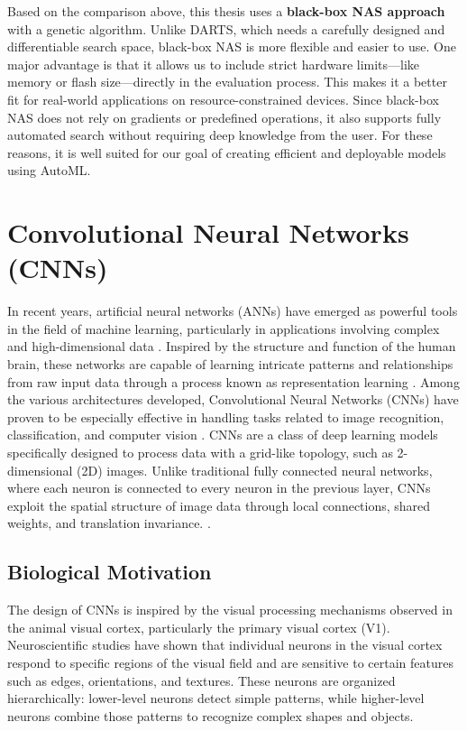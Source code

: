 \begin{sloppypar}
Based on the comparison above, this thesis uses a \textbf{black-box NAS approach} with a genetic algorithm. Unlike DARTS, which needs a carefully designed and differentiable search space, black-box NAS is more flexible and easier to use. One major advantage is that it allows us to include strict hardware limits—like memory or flash size—directly in the evaluation process. This makes it a better fit for real-world applications on resource-constrained devices. Since black-box NAS does not rely on gradients or predefined operations, it also supports fully automated search without requiring deep knowledge from the user. For these reasons, it is well suited for our goal of creating efficient and deployable models using AutoML.
\end{sloppypar}


\section{Convolutional Neural Networks (CNNs)}

In recent years, artificial neural networks (ANNs) have emerged as powerful tools in the field of machine learning, particularly in applications involving complex and high-dimensional data  \cite{lecun2015deep}. Inspired by the structure and function of the human brain, these networks are capable of learning intricate patterns and relationships from raw input data through a process known as representation learning  \cite{bengio2013representation}. Among the various architectures developed, Convolutional Neural Networks (CNNs) have proven to be especially effective in handling tasks related to image recognition, classification, and computer vision \cite{krizhevsky2017imagenet, yamashita2018convolutional}.
CNNs are a class of deep learning models specifically designed to process data with a grid-like topology, such as 2-dimensional (2D) images. Unlike traditional fully connected neural networks, where each neuron is connected to every neuron in the previous layer, CNNs exploit the spatial structure of image data through local connections, shared weights, and translation invariance. \cite{yamashita2018convolutional}.


\subsection{Biological Motivation}
The design of CNNs is inspired by the visual processing mechanisms observed in the animal visual cortex, particularly the primary visual cortex (V1). Neuroscientific studies have shown that individual neurons in the visual cortex respond to specific regions of the visual field and are sensitive to certain features such as edges, orientations, and textures. These neurons are organized hierarchically: lower-level neurons detect simple patterns, while higher-level neurons combine those patterns to recognize complex shapes and objects.

